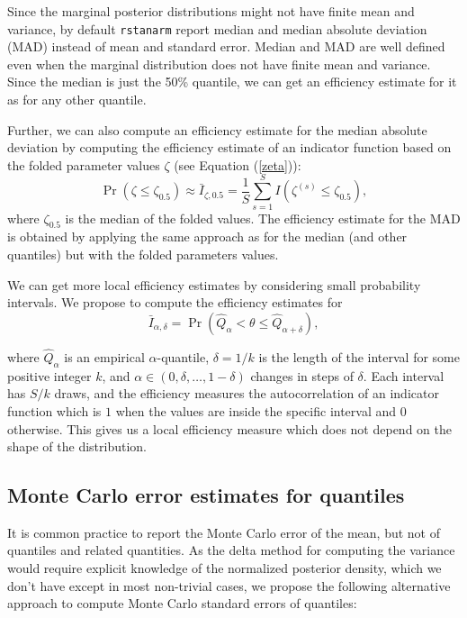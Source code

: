 \documentclass[american,]{article}
\theoremstyle{definition}
\begin{document}
Since the marginal posterior distributions might not have finite mean
and variance, by default \texttt{rstanarm}
\citep{RStanARM.2.17} report median and median absolute deviation (MAD)
instead of mean and standard error. Median and MAD are well defined
even when the marginal distribution does not have finite mean and
variance. Since the median is just the 50\% quantile, we can get an
efficiency estimate for it as for any other quantile.

Further, we can also compute an efficiency estimate for the median
absolute deviation by computing the efficiency estimate of an
indicator function based on the folded parameter values \(\zeta\) (see
Equation (\ref{zeta})):
\begin{equation}
\Pr(\zeta \leq \zeta_{0.5}) \approx \bar{I}_{\zeta,0.5} = \frac{1}{S}\sum_{s=1}^S
I(\zeta^{(s)} \leq \zeta_{0.5}),
\end{equation}
where \(\zeta_{0.5}\) is the median of the folded values. The efficiency estimate for the MAD is obtained by applying the same
approach as for the median (and other quantiles) but with the folded
parameters values.


We can get more local efficiency estimates by considering small
probability intervals. We propose to compute the efficiency estimates
for
\begin{equation}
\bar{I}_{\alpha,\delta} = \Pr(\hat{Q}_\alpha < \theta \leq \hat{Q}_{\alpha+\delta}),
\end{equation}

where \(\hat{Q}_\alpha\) is an empirical \(\alpha\)-quantile,
\(\delta=1/k\) is the length of the interval for some positive integer
\(k\), and \(\alpha \in (0,\delta,\ldots,1-\delta)\) changes in steps of
\(\delta\). Each interval has \(S/k\) draws, and the efficiency measures
the autocorrelation of an indicator function which is \(1\) when the
values are inside the specific interval and \(0\) otherwise. This gives
us a local efficiency measure which does not depend on the shape of the
distribution.

\hypertarget{mcse}{%
\subsection{Monte Carlo error estimates for quantiles}\label{mcse}}

It is common practice to report the Monte Carlo error of the mean,
but not of quantiles and related quantities. As the delta method for
computing the variance would require explicit knowledge of the
normalized posterior density, which we don't have except in most non-trivial
cases, we propose the following alternative approach to compute Monte
Carlo standard errors of quantiles:
\end{document}
